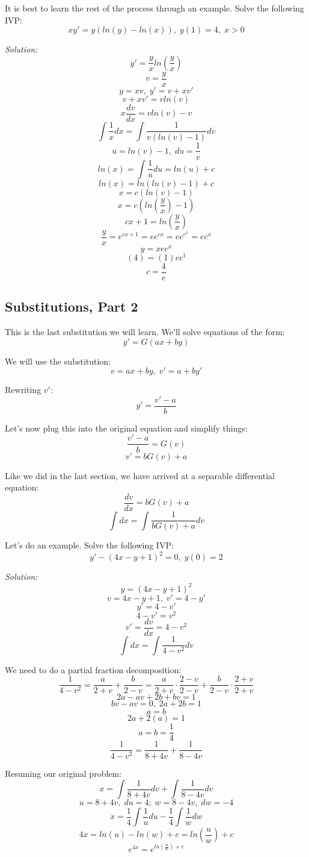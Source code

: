 	It is best to learn the rest of the process through an example. Solve the following IVP:
	$$xy' = y(ln(y) - ln(x)),\;y(1) = 4,\;x > 0$$
	
	\textit{Solution:}
	$$y' = \frac{y}{x}ln\left(\frac{y}{x}\right)$$
	$$v = \frac{y}{x}$$
	$$y = xv,\;y' = v + xv'$$
	$$v + xv' = vln(v)$$
	$$x\frac{dv}{dx} = vln(v) - v$$
	$$\int \frac{1}{x}dx = \int \frac{1}{v(ln(v) - 1)}dv$$
	$$u = ln(v) - 1,\;du = \frac{1}{v}$$
	$$ln(x) = \int \frac{1}{u}du = ln(u) + c$$
	$$ln(x) = ln(ln(v) - 1) + c$$
	$$x = c(ln(v) - 1)$$
	$$x = c\left(ln\left(\frac{y}{x}\right) - 1\right)$$
	$$cx + 1 = ln\left(\frac{y}{x}\right)$$
	$$\frac{y}{x} = e^{cx + 1} = ee^{cx} = ee^{c^{x}} = ec^{x}$$
	$$y = xec^{x}$$
	$$(4) = (1)ec^{1}$$
	$$c = \frac{4}{e}$$
	\begin{center}
	\end{center}
	
	\subsection{Substitutions, Part 2}
	This is the last substitution we will learn. We'll solve equations of the form:
	$$y' = G(ax + by)$$
	
	We will use the substitution:
	$$v = ax + by,\;v' = a + by'$$
	
	Rewriting $v'$:
	$$y' = \frac{v' - a}{b}$$
	
	Let's now plug this into the original equation and simplify things:
	$$\frac{v' - a}{b} = G(v)$$
	$$v' = bG(v) + a$$
	
	Like we did in the last section, we have arrived at a separable differential equation:
	$$\frac{dv}{dx} = bG(v) + a$$
	$$\int dx = \int \frac{1}{bG(v) + a}dv$$
	
	Let's do an example. Solve the following IVP:
	$$y' - (4x - y + 1)^{2} = 0,\;y(0) = 2$$
	
	\textit{Solution:}
	$$y = (4x - y + 1)^{2}$$
	$$v = 4x - y + 1,\;v' = 4 - y'$$
	$$y' = 4 - v'$$
	$$4 - v' = v^{2}$$
	$$v' = \frac{dv}{dx} = 4 - v^{2}$$
	$$\int dx = \int \frac{1}{4 - v^{2}}dv$$
	
	We need to do a partial fraction decomposition:
	$$\frac{1}{4 - v^{2}} = \frac{a}{2 + v} + \frac{b}{2 - v} = \frac{a}{2 + v}\cdot\frac{2 - v}{2 - v} + \frac{b}{2 - v}\cdot\frac{2 + v}{2 + v}$$
	$$2a - av + 2b + bv = 1$$
	$$bv - av = 0,\;2a + 2b = 1$$
	$$a = b$$
	$$2a + 2(a) = 1$$
	$$a = b = \frac{1}{4}$$
	$$\frac{1}{4 - v^{2}} = \frac{1}{8 + 4v} + \frac{1}{8 - 4v}$$
	
	Resuming our original problem:
	$$x = \int \frac{1}{8 + 4v}dv + \int \frac{1}{8 - 4v}dv$$
	$$u = 8 + 4v,\;du = 4;\;w = 8 - 4v,\;dw = -4$$
	$$x = \frac{1}{4}\int \frac{1}{u}du - \frac{1}{4}\int \frac{1}{w}dw$$
	$$4x = ln(u) - ln(w) + c = ln\left(\frac{u}{w}\right) + c$$
	$$e^{4x} = e^{ln(\frac{u}{w}) + c}$$
